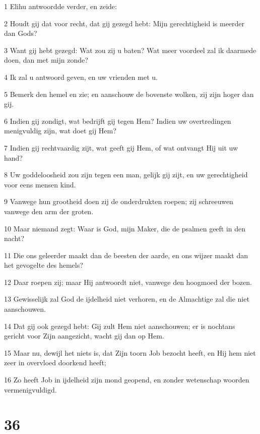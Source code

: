 \par 1 Elihu antwoordde verder, en zeide:
\par 2 Houdt gij dat voor recht, dat gij gezegd hebt: Mijn gerechtigheid is meerder dan Gods?
\par 3 Want gij hebt gezegd: Wat zou zij u baten? Wat meer voordeel zal ik daarmede doen, dan met mijn zonde?
\par 4 Ik zal u antwoord geven, en uw vrienden met u.
\par 5 Bemerk den hemel en zie; en aanschouw de bovenste wolken, zij zijn hoger dan gij.
\par 6 Indien gij zondigt, wat bedrijft gij tegen Hem? Indien uw overtredingen menigvuldig zijn, wat doet gij Hem?
\par 7 Indien gij rechtvaardig zijt, wat geeft gij Hem, of wat ontvangt Hij uit uw hand?
\par 8 Uw goddeloosheid zou zijn tegen een man, gelijk gij zijt, en uw gerechtigheid voor eens mensen kind.
\par 9 Vanwege hun grootheid doen zij de onderdrukten roepen; zij schreeuwen vanwege den arm der groten.
\par 10 Maar niemand zegt: Waar is God, mijn Maker, die de psalmen geeft in den nacht?
\par 11 Die ons geleerder maakt dan de beesten der aarde, en ons wijzer maakt dan het gevogelte des hemels?
\par 12 Daar roepen zij; maar Hij antwoordt niet, vanwege den hoogmoed der bozen.
\par 13 Gewisselijk zal God de ijdelheid niet verhoren, en de Almachtige zal die niet aanschouwen.
\par 14 Dat gij ook gezegd hebt: Gij zult Hem niet aanschouwen; er is nochtans gericht voor Zijn aangezicht, wacht gij dan op Hem.
\par 15 Maar nu, dewijl het niets is, dat Zijn toorn Job bezocht heeft, en Hij hem niet zeer in overvloed doorkend heeft;
\par 16 Zo heeft Job in ijdelheid zijn mond geopend, en zonder wetenschap woorden vermenigvuldigd.

\chapter{36}

